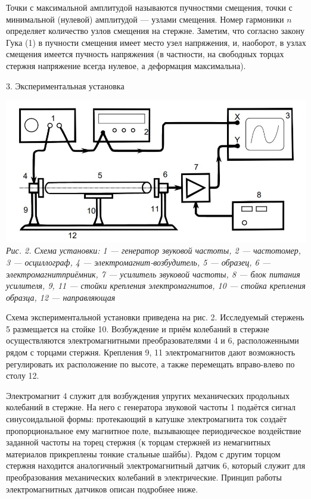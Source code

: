 \documentclass[12pt, a4paper]{article}
\begin{document}
Точки с максимальной амплитудой называются пучностями смещения, точки с минимальной
(нулевой) амплитудой --- узлами смещения. Номер гармоники $n$ определяет количество узлов смещения на стержне. 
Заметим, что согласно закону Гука (1) в пучности смещения имеет место узел напряжения, и, наоборот,
в узлах смещения имеется пучность напряжения (в частности, на свободных торцах стержня напряжение всегда нулевое, а деформация максимальна).

\vspace{1cm}
{\Large 3. Экспериментальная установка \\}

\begin{center}
    \includegraphics[scale=0.9]{Pics/picture2.jpg} \\
    \textit{\textcolor[HTML]{000000}{Рис. 2. Схема установки: 1 --- генератор звуковой частоты, 2 --- частотомер,
    3 --- осциллограф, 4 --- электромагнит-возбудитель, 5 --- образец, 6 --- электромагнитприёмник, 7 --- усилитель звуковой частоты, 8 --- блок питания усилителя,
    9, 11 --- стойки крепления электромагнитов, 10 --- стойка крепления образца, 12 --- направляющая}}
\end{center}

Схема экспериментальной установки приведена на рис. 2. Исследуемый
стержень 5 размещается на стойке 10. Возбуждение и приём колебаний в
стержне осуществляются электромагнитными преобразователями 4 и 6,
расположенными рядом с торцами стержня. Крепления 9, 11 электромагнитов дают возможность регулировать их расположение по высоте, а
также перемещать вправо-влево по столу 12.

Электромагнит 4 служит для возбуждения упругих механических продольных колебаний в стержне. На него с генератора звуковой частоты 1 подаётся сигнал синусоидальной формы: 
протекающий в катушке электромагнита ток создаёт пропорциональное ему магнитное поле, вызывающее
периодическое воздействие заданной частоты на торец стержня (к торцам
стержней из немагнитных материалов прикреплены тонкие стальные
шайбы). Рядом с другим торцом стержня находится аналогичный электромагнитный датчик 6, который служит для преобразования механических
колебаний в электрические. Принцип работы электромагнитных датчиков
описан подробнее ниже.
\end{document}
